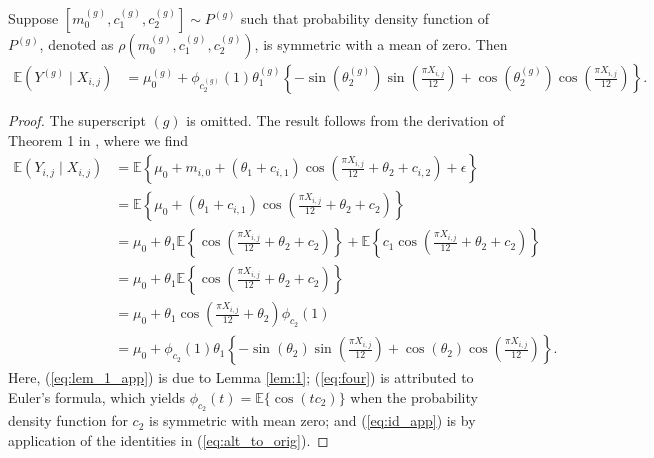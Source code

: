 \begin{lemma} \label{lem:3}
Suppose $[m^{(g)}_0, c^{(g)}_1, c^{(g)}_2]\sim P^{(g)}$ such that probability density function of $P^{(g)}$, denoted as $\rho(m^{(g)}_0, c^{(g)}_1, c^{(g)}_2)$, is symmetric with a mean of zero. Then
\begin{align*}
    \mathbb{E}(Y^{(g)} \mid X_{i,j}) &= \mu^{(g)}_0 + \phi_{c^{(g)}_2}(1)\theta^{(g)}_1\left\{- \sin(\theta^{(g)}_2)\sin\left(\frac{\pi X_{i,j}}{12} \right) + \cos(\theta^{(g)}_2)\cos\left(\frac{\pi X_{i,j}}{12} \right)\right\}.
\end{align*}
\end{lemma}
\begin{proof}
The superscript $(g)$ is omitted. The result follows from the derivation of Theorem 1 in \cite{Gorczyca2023}, where we find
\begin{align}
\mathbb{E}(Y_{i,j} \mid X_{i,j}) &= \mathbb{E}\left\{\mu_0 + m_{i,0} +  (\theta_1+c_{i,1})\cos\left(\frac{\pi X_{i,j}}{12} + \theta_2 + c_{i,2}\right)+\epsilon\right\} \nonumber \\
&= \mathbb{E}\left\{\mu_0 +  (\theta_1+c_{i,1})\cos\left(\frac{\pi X_{i,j}}{12} + \theta_2 + c_2\right)\right\} \nonumber \\
&= \mu_0 + \theta_1\mathbb{E}\left\{\cos\left(\frac{\pi X_{i,j}}{12} + \theta_2 + c_2\right)\right\} + \mathbb{E}\left\{c_1\cos\left(\frac{\pi X_{i,j}}{12} + \theta_2 + c_2\right)\right\} \label{eq:lem_1_app} \\
&= \mu_0 + \theta_1\mathbb{E}\left\{\cos\left(\frac{\pi X_{i,j}}{12} + \theta_2 + c_2\right)\right\} \nonumber \\
&= \mu_0 + \theta_1\cos\left(\frac{\pi X_{i,j}}{12} + \theta_2\right)\phi_{c_2}(1) \label{eq:four} \\
&= \mu_0 + \phi_{c_2}(1)\theta_1\left\{- \sin(\theta_2)\sin\left(\frac{\pi X_{i,j}}{12} \right) + \cos(\theta_2)\cos\left(\frac{\pi X_{i,j}}{12} \right)\right\}. \label{eq:id_app}
\end{align}
Here, (\ref{eq:lem_1_app}) is due to Lemma \ref{lem:1}; (\ref{eq:four}) is attributed to Euler's formula, which yields $\phi_{c_{2}}(t) = \mathbb{E}\{\cos(tc_2)\}$ when the probability density function for $c_{2}$ is symmetric with mean zero; and (\ref{eq:id_app}) is by application of the identities in (\ref{eq:alt_to_orig}).
\end{proof}


